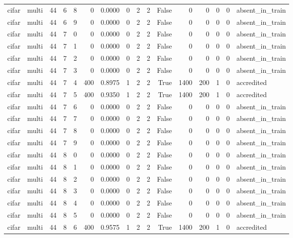 \begin{tabular}{llrrrrrrrrrrrrrl}
cifar & multi & 44 & 6 & 8 & 0 & 0.0000 & 0 & 2 & 2 & False & 0 & 0 & 0 & 0 & absent\_in\_train \\
cifar & multi & 44 & 6 & 9 & 0 & 0.0000 & 0 & 2 & 2 & False & 0 & 0 & 0 & 0 & absent\_in\_train \\
cifar & multi & 44 & 7 & 0 & 0 & 0.0000 & 0 & 2 & 2 & False & 0 & 0 & 0 & 0 & absent\_in\_train \\
cifar & multi & 44 & 7 & 1 & 0 & 0.0000 & 0 & 2 & 2 & False & 0 & 0 & 0 & 0 & absent\_in\_train \\
cifar & multi & 44 & 7 & 2 & 0 & 0.0000 & 0 & 2 & 2 & False & 0 & 0 & 0 & 0 & absent\_in\_train \\
cifar & multi & 44 & 7 & 3 & 0 & 0.0000 & 0 & 2 & 2 & False & 0 & 0 & 0 & 0 & absent\_in\_train \\
cifar & multi & 44 & 7 & 4 & 400 & 0.8975 & 1 & 2 & 2 & True & 1400 & 200 & 1 & 0 & accredited \\
cifar & multi & 44 & 7 & 5 & 400 & 0.9350 & 1 & 2 & 2 & True & 1400 & 200 & 1 & 0 & accredited \\
cifar & multi & 44 & 7 & 6 & 0 & 0.0000 & 0 & 2 & 2 & False & 0 & 0 & 0 & 0 & absent\_in\_train \\
cifar & multi & 44 & 7 & 7 & 0 & 0.0000 & 0 & 2 & 2 & False & 0 & 0 & 0 & 0 & absent\_in\_train \\
cifar & multi & 44 & 7 & 8 & 0 & 0.0000 & 0 & 2 & 2 & False & 0 & 0 & 0 & 0 & absent\_in\_train \\
cifar & multi & 44 & 7 & 9 & 0 & 0.0000 & 0 & 2 & 2 & False & 0 & 0 & 0 & 0 & absent\_in\_train \\
cifar & multi & 44 & 8 & 0 & 0 & 0.0000 & 0 & 2 & 2 & False & 0 & 0 & 0 & 0 & absent\_in\_train \\
cifar & multi & 44 & 8 & 1 & 0 & 0.0000 & 0 & 2 & 2 & False & 0 & 0 & 0 & 0 & absent\_in\_train \\
cifar & multi & 44 & 8 & 2 & 0 & 0.0000 & 0 & 2 & 2 & False & 0 & 0 & 0 & 0 & absent\_in\_train \\
cifar & multi & 44 & 8 & 3 & 0 & 0.0000 & 0 & 2 & 2 & False & 0 & 0 & 0 & 0 & absent\_in\_train \\
cifar & multi & 44 & 8 & 4 & 0 & 0.0000 & 0 & 2 & 2 & False & 0 & 0 & 0 & 0 & absent\_in\_train \\
cifar & multi & 44 & 8 & 5 & 0 & 0.0000 & 0 & 2 & 2 & False & 0 & 0 & 0 & 0 & absent\_in\_train \\
cifar & multi & 44 & 8 & 6 & 400 & 0.9575 & 1 & 2 & 2 & True & 1400 & 200 & 1 & 0 & accredited \\

\end{tabular}
